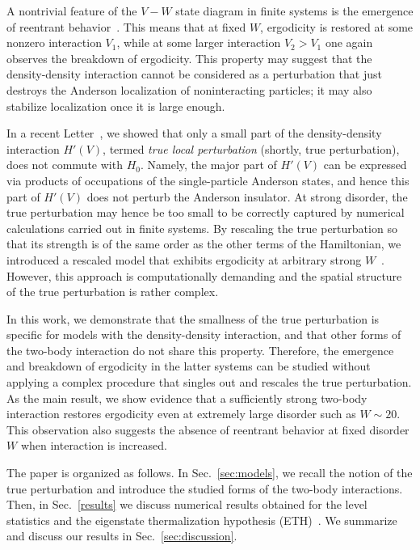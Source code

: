 \documentclass[twocolumn,pre,superscriptaddress,10pt,aps,floatfix]{revtex4-1}
\begin{document}
A nontrivial feature of the $V-W$ state diagram in finite systems is the emergence of reentrant behavior~\cite{deluca13,lev15}.
This means that at fixed $W$, ergodicity is restored at some nonzero interaction $V_1$, while at some larger interaction $V_2>V_1$ one again observes the breakdown of ergodicity.
This property may suggest that the density-density interaction cannot be considered as a perturbation that just destroys the Anderson localization of noninteracting particles; it may also stabilize localization once it is large enough. 

In a recent Letter~\cite{krajewski_vidmar_22}, we showed that only a small part of the density-density interaction $H'(V)$, termed {\it true local perturbation} (shortly, true perturbation), does not commute with $H_0$. Namely, the major part of $H'(V)$ can be expressed via products of occupations of the single-particle Anderson states, and hence this part of $H'(V)$ does not perturb  the Anderson insulator. 
At strong disorder, the true perturbation may hence be too small to be correctly captured by numerical calculations carried out in finite systems.
By rescaling the true perturbation so that its strength is of the same order as the other terms of the Hamiltonian, we introduced a rescaled model that exhibits ergodicity at arbitrary strong $W$~\cite{krajewski_vidmar_22}. However, this approach is computationally demanding and the spatial structure of the true perturbation is rather complex.  

In this work, we demonstrate that the smallness of the true perturbation is specific for models with the density-density interaction, and that other forms of the two-body interaction do not share this property. 
Therefore,  the emergence and breakdown of ergodicity  in the latter systems can be studied without applying a complex procedure that singles out and rescales  the true perturbation.
As the main result, we show evidence that a sufficiently strong two-body interaction restores ergodicity even at extremely large disorder such as $W\sim 20$.
This observation also suggests the absence of reentrant behavior at fixed disorder $W$ when interaction is increased.

The paper is organized as follows.
In Sec.~\ref{sec:models}, we recall the notion of the true perturbation and introduce the studied forms of the two-body interactions. Then, in Sec.~\ref{results} we discuss numerical results obtained for the level statistics and the eigenstate thermalization hypothesis (ETH)~\cite{deutsch_91,srednicki_94,rigol_dunjko_08,dalessio_kafri_16}.
We summarize and discuss our results in Sec.~\ref{sec:discussion}.
  
\end{document}
